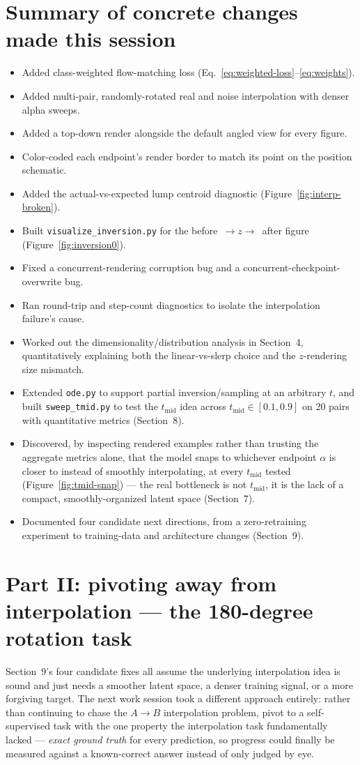 \documentclass[11pt]{article}
\newcommand{\hsec}[1]{\section*{\color{hdrblue}#1}}
\begin{document}
\hsec{Summary of concrete changes made this session}
\begin{itemize}[nosep]
\item Added class-weighted flow-matching loss (Eq.~\eqref{eq:weighted-loss}--\eqref{eq:weights}).
\item Added multi-pair, randomly-rotated real and noise interpolation with denser alpha sweeps.
\item Added a top-down render alongside the default angled view for every figure.
\item Color-coded each endpoint's render border to match its point on the position schematic.
\item Added the actual-vs-expected lump centroid diagnostic (Figure~\ref{fig:interp-broken}).
\item Built \texttt{visualize\_inversion.py} for the before~$\to z\to$~after figure (Figure~\ref{fig:inversion0}).
\item Fixed a concurrent-rendering corruption bug and a concurrent-checkpoint-overwrite bug.
\item Ran round-trip and step-count diagnostics to isolate the interpolation failure's cause.
\item Worked out the dimensionality/distribution analysis in Section~4, quantitatively
  explaining both the linear-vs-slerp choice and the $z$-rendering size mismatch.
\item Extended \texttt{ode.py} to support partial inversion/sampling at an arbitrary $t$, and
  built \texttt{sweep\_tmid.py} to test the $t_{\text{mid}}$ idea across $t_{\text{mid}} \in
  [0.1, 0.9]$ on 20 pairs with quantitative metrics (Section~8).
\item Discovered, by inspecting rendered examples rather than trusting the aggregate metrics
  alone, that the model snaps to whichever endpoint $\alpha$ is closer to instead of smoothly
  interpolating, at every $t_{\text{mid}}$ tested (Figure~\ref{fig:tmid-snap}) --- the real
  bottleneck is not $t_{\text{mid}}$, it is the lack of a compact, smoothly-organized latent
  space (Section~7).
\item Documented four candidate next directions, from a zero-retraining experiment to
  training-data and architecture changes (Section~9).
\end{itemize}

\newpage
\hsec{Part II: pivoting away from interpolation --- the 180-degree rotation task}

Section~9's four candidate fixes all assume the underlying interpolation idea is sound and
just needs a smoother latent space, a denser training signal, or a more forgiving target. The
next work session took a different approach entirely: rather than continuing to chase the
$A\!\to\!B$ interpolation problem, pivot to a self-supervised task with the one property the
interpolation task fundamentally lacked --- \emph{exact ground truth} for every prediction,
so progress could finally be measured against a known-correct answer instead of only judged
by eye.
\end{document}
